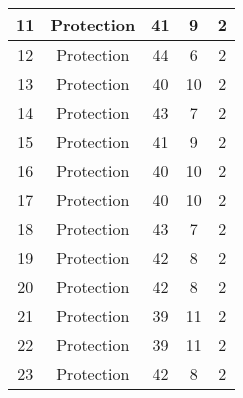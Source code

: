 \documentclass[results.tex]{subfiles}
\begin{document}
\begin{center}
\begin{tabular}{| c || c | c | c | c |}
            \hline
            11                      & Protection                   & 41                     & 9                       & 2                    \\
            \hline
            12                      & Protection                   & 44                     & 6                       & 2                    \\
            \hline
            13                      & Protection                   & 40                     & 10                      & 2                    \\
            \hline
            14                      & Protection                   & 43                     & 7                       & 2                    \\
            \hline
            15                      & Protection                   & 41                     & 9                       & 2                    \\
            \hline
            16                      & Protection                   & 40                     & 10                      & 2                    \\
            \hline
            17                      & Protection                   & 40                     & 10                      & 2                    \\
            \hline
            18                      & Protection                   & 43                     & 7                       & 2                    \\
            \hline
            19                      & Protection                   & 42                     & 8                       & 2                    \\
            \hline
            20                      & Protection                   & 42                     & 8                       & 2                    \\
            \hline
            21                      & Protection                   & 39                     & 11                      & 2                    \\
            \hline
            22                      & Protection                   & 39                     & 11                      & 2                    \\
            \hline
            23                      & Protection                   & 42                     & 8                       & 2                    \\

\end{tabular}
\end{center}
\end{document}
